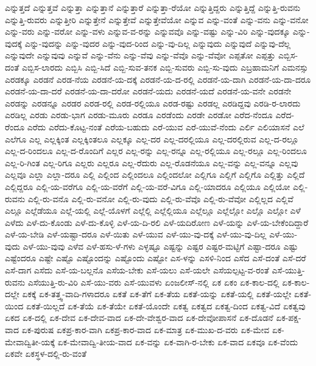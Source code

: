 {ಎನ್ನುತ್ತದೆ
ಎನ್ನುತ್ತವೆ
ಎನ್ನುತ್ತಾ
ಎನ್ನುತ್ತಾನೆ
ಎನ್ನುತ್ತಾರೆ
ಎನ್ನುತ್ತಾ-ರೆಯೋ
ಎನ್ನುತ್ತಿದ್ದರು
ಎನ್ನುತ್ತಿದ್ದೆ
ಎನ್ನುತ್ತಿ-ರುವನು
ಎನ್ನುತ್ತಿ-ರುವರು
ಎನ್ನುತ್ತೀರಿ
ಎನ್ನುತ್ತೇನೆ
ಎನ್ನುತ್ತೇವೆ
ಎನ್ನುತ್ತೇವೆಯೋ
ಎನ್ನುವ
ಎನ್ನು-ವಂತೆ
ಎನ್ನು-ವನು
ಎನ್ನು-ವನೋ
ಎನ್ನು-ವರು
ಎನ್ನು-ವರೋ
ಎನ್ನು-ವಳು
ಎನ್ನುವ-ವ-ರನ್ನು
ಎನ್ನುವವೊ
ಎನ್ನು-ವಷ್ಟು
ಎನ್ನು-ವಿರಿ
ಎನ್ನು-ವುದಕ್ಕೂ
ಎನ್ನು-ವುದಕ್ಕೆ
ಎನ್ನು-ವುದನ್ನು
ಎನ್ನು-ವುದರ
ಎನ್ನು-ವುದ-ರಿಂದ
ಎನ್ನು-ವು-ದಿಲ್ಲ
ಎನ್ನುವುದು
ಎನ್ನುವುದೆ
ಎನ್ನುವು-ದೆಲ್ಲ
ಎನ್ನುವುದೇ
ಎನ್ನುವುವು
ಎನ್ನುವೆ
ಎನ್ನು-ವೆನು
ಎನ್ನು-ವೆವು
ಎನ್ನು-ವೆವೊ
ಎನ್ನು-ವೆವೋ
ಎಪ್ಪತೋ
ಎಪ್ಪತ್ತು
ಎಬ್ಬಿಸ-ದಂತೆ
ಎಬ್ಬಿಸ-ಲಾರದು
ಎಬ್ಬಿಸಿ
ಎಬ್ಬಿ-ಸಿದೆ
ಎಬ್ಬಿ-ಸುವ-ತನಕ
ಎಬ್ಬಿ-ಸುವರು
ಎಬ್ಬಿ-ಸು-ವುದು
ಎಬ್ರಹಾಮನಿಗೆ
ಎಮನಸ್ಸು
ಎರಡಕ್ಕೂ
ಎರಡನೆ
ಎರಡ-ನೆಯ
ಎರಡನೆ-ಯ-ದಕ್ಕೆ
ಎರಡನೆ-ಯ-ದ-ರಲ್ಲಿ
ಎರಡನೆ-ಯ-ದಾಗಿ
ಎರಡನೆ-ಯ-ದಾ-ದರೂ
ಎರಡನೆ-ಯ-ದಾ-ದರೆ
ಎರಡನೆ-ಯ-ದಾ-ದರೋ
ಎರಡನೆ-ಯದು
ಎರಡನೆ-ಯದೆ
ಎರಡನೆ-ಯ-ವನೇ
ಎರಡನೇ
ಎರಡನ್ನು
ಎರಡನ್ನೂ
ಎರಡರ
ಎರಡ-ರಲ್ಲಿ
ಎರಡ-ರಲ್ಲಿಯೂ
ಎರಡ-ರಷ್ಟು
ಎರಡಲ್ಲ
ಎರಡಿದ್ದವು
ಎರಡಿ-ರ-ಲಾರದು
ಎರಡಿಲ್ಲ
ಎರಡು
ಎರಡು-ಭಾಗ
ಎರಡು-ಮೂರು
ಎರಡೂ
ಎರಡೆಂದು
ಎರಡೇ
ಎರಡೋ
ಎರೆದ-ನೆಂದೂ
ಎರೆದ-ರೆಂದೂ
ಎರೆದು
ಎರೆದು-ಕೊಟ್ಟ-ನಂತೆ
ಎರೆಯ-ಬಹುದು
ಎರೆ-ಯುವ
ಎರೆ-ಯುವೆ-ನೆಂದು
ಎರ್ಲಿ
ಎಲಿಯಾಸನೆ
ಎಲೆ
ಎಲೆಗೂ
ಎಲ್ಲ
ಎಲ್ಲಕ್ಕಿಂತ
ಎಲ್ಲಕ್ಕಿಂತಲೂ
ಎಲ್ಲಕ್ಕೂ
ಎಲ್ಲ-ದರ
ಎಲ್ಲ-ದರಲ್ಲಿಯೂ
ಎಲ್ಲ-ದರಲ್ಲಿರುವ
ಎಲ್ಲ-ದ-ರಲ್ಲೂ
ಎಲ್ಲ-ದ-ರಿಂದಲೂ
ಎಲ್ಲ-ದ-ರೊಂದಿಗೆ
ಎಲ್ಲರ
ಎಲ್ಲ-ರನ್ನು
ಎಲ್ಲ-ರನ್ನೂ
ಎಲ್ಲ-ರಲ್ಲಿಯೂ
ಎಲ್ಲ-ರಲ್ಲೂ
ಎಲ್ಲ-ರಿಂದಲೂ
ಎಲ್ಲ-ರಿ-ಗಿಂತ
ಎಲ್ಲ-ರಿಗೂ
ಎಲ್ಲರು
ಎಲ್ಲರೂ
ಎಲ್ಲ-ರೆದುರು
ಎಲ್ಲ-ರೊಡನೆಯೂ
ಎಲ್ಲ-ವನ್ನು
ಎಲ್ಲ-ವನ್ನೂ
ಎಲ್ಲವು
ಎಲ್ಲವೂ
ಎಲ್ಲಾ
ಎಲ್ಲಾ-ದರೂ
ಎಲ್ಲಿ
ಎಲ್ಲಿಂದ
ಎಲ್ಲಿಂದಲೂ
ಎಲ್ಲಿಂದಲೋ
ಎಲ್ಲಿಗೂ
ಎಲ್ಲಿಗೆ
ಎಲ್ಲಿಗೊ
ಎಲ್ಲಿತ್ತು
ಎಲ್ಲಿದೆ
ಎಲ್ಲಿದ್ದರೂ
ಎಲ್ಲಿ-ಯ-ವರೆಗೂ
ಎಲ್ಲಿ-ಯ-ವರೆಗೆ
ಎಲ್ಲಿ-ಯ-ವರೆ-ವಿಗೂ
ಎಲ್ಲಿ-ಯಾದರೂ
ಎಲ್ಲಿಯೂ
ಎಲ್ಲಿಯೋ
ಎಲ್ಲಿ-ರುವನು
ಎಲ್ಲಿ-ರು-ವನೊ
ಎಲ್ಲಿ-ರು-ವನೋ
ಎಲ್ಲಿ-ರು-ವುದು
ಎಲ್ಲಿ-ರು-ವೆವೊ
ಎಲ್ಲಿ-ರು-ವೆವೋ
ಎಲ್ಲಿಲ್ಲದ
ಎಲ್ಲಿವೆ
ಎಲ್ಲೂ
ಎಲ್ಲೆಡೆಯೂ
ಎಲ್ಲೆ-ಯಲ್ಲಿ
ಎಲ್ಲೆ-ಯೊಳಗೆ
ಎಲ್ಲೆಲ್ಲಿ
ಎಲ್ಲೆಲ್ಲಿಯೂ
ಎಲ್ಲೆಲ್ಲೂ
ಎಲ್ಲೆಲ್ಲೋ
ಎಲ್ಲೊ
ಎಲ್ಲೋ
ಎಳೆ
ಎಳೆದು
ಎಳೆ-ದು-ಕೊಂಡು
ಎಳೆ-ದು-ಕೊಳ್ಳಿ
ಎಳೆ-ಯ-ದಿ-ರಲಿ
ಎಳೆ-ಯದಿರೋಣ
ಎಳೆ-ಯನ್ನು
ಎಳೆ-ಯ-ಬೇಕೆಂದಿದ್ದಾರೆ
ಎಳೆ-ಯ-ಬೇಡಿ
ಎಳೆ-ಯಷ್ಟಾ-ದರೂ
ಎಳೆ-ಯಿತು
ಎಳೆ-ಯುವ
ಎಳೆ-ಯು-ವು-ದಕ್ಕೆ
ಎಳೆ-ಯು-ವು-ದಿಲ್ಲ
ಎಳೆ-ಯು-ವುದು
ಎಳೆ-ಯು-ವುವು
ಎಳೆವ
ಎಳೆ-ಹಸು-ಳೆ-ಗಳು
ಎಳ್ಳಷ್ಟೂ
ಎಷ್ಟನ್ನು
ಎಷ್ಟರ
ಎಷ್ಟರ-ಮಟ್ಟಿಗೆ
ಎಷ್ಟಾ-ದರೂ
ಎಷ್ಟು
ಎಷ್ಟೆಂದರೂ
ಎಷ್ಟೇ
ಎಷ್ಟೊ
ಎಷ್ಟೊಂದನ್ನು
ಎಷ್ಟೊಂದು
ಎಷ್ಟೋ
ಎಸ-ಳನ್ನು
ಎಸಳಿ-ನಿಂದ
ಎಸೆದ
ಎಸೆ-ದಂತೆ
ಎಸೆ-ದರೆ
ಎಸೆ-ದಾಗ
ಎಸೆದು
ಎಸೆ-ಯ-ಬಲ್ಲನೊ
ಎಸೆಯ-ಬೇಕು
ಎಸೆ-ಯಲು
ಎಸೆ-ಯಲೇ
ಎಸೆಯಲ್ಪಟ್ಟ-ವ-ರಂತೆ
ಎಸೆ-ಯುತ್ತಿ-ರುವನು
ಎಸೆಯುತ್ತಿ-ರು-ವಿರಿ
ಎಸೆ-ಯು-ವರು
ಎಸೆ-ಯುವಳು
ಏಂಜಲೀಸ್-ನಲ್ಲಿ
ಏಕ
ಏಕಂ
ಏಕ-ಕಾಲ-ದಲ್ಲಿ
ಏಕ-ಕಾಲ-ದಲ್ಲೇ
ಏಕಕ್ಕೆ
ಏಕ-ತತ್ತ್ವ-ವಾದಿ-ಗಳಾದರೂ
ಏಕತೆ
ಏಕ-ತೆಗೆ
ಏಕ-ತೆಯ
ಏಕತೆ-ಯನ್ನು
ಏಕತೆ-ಯಲ್ಲಿ
ಏಕತೆ-ಯಲ್ಲೇ
ಏಕತೆ-ಯಿಂದ
ಏಕತೆ-ಯಿಲ್ಲದೆ
ಏಕ-ತೆಯೆ
ಏಕ-ತೆಯೇ
ಏಕತೆ-ಯೊಂದೇ
ಏಕತ್ವ
ಏಕತ್ವದ
ಏಕತ್ವ-ದಿಂದ
ಏಕತ್ವ-ವಿದೆ
ಏಕತ್ವವು
ಏಕದ
ಏಕ-ದಲ್ಲಿ
ಏಕ-ದೇವ
ಏಕ-ದೇವ-ವಾದ
ಏಕ-ದೇ-ವೇಶ್ವರ-ವಾದ
ಏಕ-ದೇವೋಪಾಸನೆ
ಏಕ-ದೊಡನೆ
ಏಕ-ಪಕ್ಷ-ವಾದ
ಏಕ-ಪುರುಷ
ಏಕಪ್ರ-ಕಾರ-ವಾಗಿ
ಏಕಪ್ರ-ಕಾರ-ವಾದ
ಏಕ-ಮಾತ್ರ
ಏಕ-ಮುಖ-ದ-ವರು
ಏಕ-ಮೇವ
ಏಕ-ಮೇವಾದ್ವಿತೀ-ಯಕ್ಕೆ
ಏಕ-ಮೇವಾದ್ವಿ-ತೀಯ-ವಾದ
ಏಕ-ವನ್ನು
ಏಕ-ವಾಗಿ-ರ-ಬೇಕು
ಏಕ-ವಾದ
ಏಕವೂ
ಏಕ-ವೆಂದು
ಏಕವೇ
ಏಕಸ್ಥಳ-ದಲ್ಲಿ-ರು-ವಂತೆ
}
